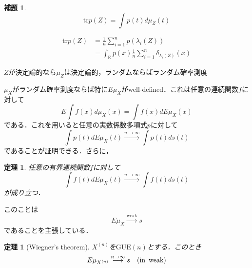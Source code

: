 \documentclass{ltjsarticle}
\makeatletter
\theoremstyle{mystyle1}
\newtheorem{thm}[dfn]{定理}
\newtheorem{lem}[dfn]{補題}
\theoremstyle{mystyle2}
\theoremstyle{mystyle3}
\renewenvironment{proof}[1][\proofname]{\par
  \pushQED{\qed}%
  \normalfont
  \topsep6\p@\@plus6\p@ \trivlist
  \item[\hskip\labelsep{\bfseries\sffamily #1}]\ignorespaces
}{%
  \popQED\endtrivlist\@endpefalse
}
\renewcommand\proofname{証明}
\makeatother
\begin{document}
\begin{lem}
    \begin{equation}
        \mathrm{tr}p(Z)=\int p(t)d\mu_Z(t)
    \end{equation}
\end{lem}

\begin{proof}
    \begin{equation}
        \begin{split}
            \mathrm{tr}p(Z)&=\frac{1}{n}\sum_{i=1}^np(\lambda_i(Z))\\
            &=\int_\mathbb{R}p(x)\frac{1}{n}\sum_{i=1}^n\delta_{\lambda_i(Z)}(x)
        \end{split}
    \end{equation}
\end{proof}

$Z$が決定論的なら$\mu_Z$は決定論的，ランダムならばランダム確率測度

$\mu_X$がランダム確率測度ならば特に$E\mu_{X}$がwell-defined．これは任意の連続関数$f$に対して
\begin{equation}
    E\int f(x)d\mu_{X}(x)=\int f(x)dE\mu_{X}(x)
\end{equation}
である．これを用いると任意の実数係数多項式$p$に対して
\begin{equation}
    \int p(t)dE\mu_{X}(t)\overset{n\to\infty}{\longrightarrow}\int p(t)ds(t)
\end{equation}
であることが証明できる．さらに，
\begin{thm}
    任意の有界連続関数$f$に対して
    \begin{equation}
        \int f(t)dE\mu_{X}(t)\overset{n\to\infty}{\longrightarrow}\int f(t)ds(t)
    \end{equation}
    が成り立つ．
\end{thm}
このことは
\begin{equation}
    E\mu_{X}\overset{\mathrm{weak}}{\longrightarrow} s
\end{equation}
であることを主張している．

\begin{thm}[Wiegner's theorem]
    $X^{(n)}$を$\mathrm{GUE}(n)$とする．このとき
    \begin{equation}
        E\mu_{X^{(n)}}\overset{n\to\infty}{\longrightarrow} s\quad(\textrm{in\, weak})
    \end{equation}
\end{thm}
\end{document}

